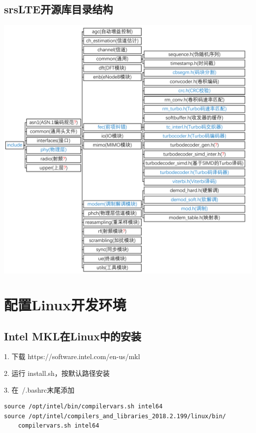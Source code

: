 \documentclass{article}
\begin{document}
\subsection{srsLTE开源库目录结构}
\includegraphics[width = \textwidth]{dirStructure.pdf}

\section{配置Linux开发环境}

\subsection{Intel MKL在Linux中的安装}
1. 下载 https://software.intel.com/en-us/mkl

2. 运行 install.sh，按默认路径安装

3. 在~/.bashrc末尾添加
\lstset{language=C}
\begin{lstlisting}
source /opt/intel/bin/compilervars.sh intel64
source /opt/intel/compilers_and_libraries_2018.2.199/linux/bin/
    compilervars.sh intel64
\end{lstlisting}
\end{document}
